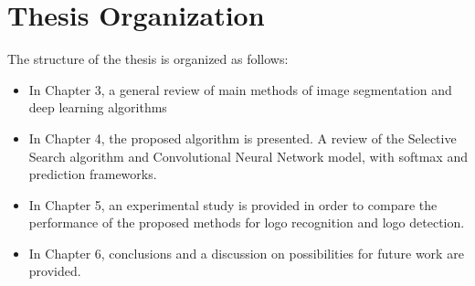 \vspace{-0.3cm}
\section{Thesis Organization}\label{sec:2.3}
\vspace{-0.5cm}
\noindent The structure of the thesis is organized as follows:

\vspace{-0.8cm}
\begin{itemize}
  \item  In Chapter 3, a general review of main methods of image segmentation and deep learning algorithms%
\vspace{-0.3cm}
  \item In Chapter 4, the proposed algorithm is presented. A review of the Selective Search algorithm and Convolutional Neural Network model, with softmax and prediction frameworks.
\vspace{-0.3cm}
  \item In Chapter 5, an experimental study is provided in order to compare the performance of the proposed methods for logo recognition and logo detection.
\vspace{-0.3cm}
  \item In Chapter 6, conclusions and a discussion on possibilities for future work are provided.
\end{itemize}

\vspace{-0.5cm}
